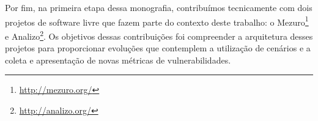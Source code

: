 Por fim, na primeira etapa dessa monografia, contribuímos tecnicamente com dois projetos de software livre que fazem parte do contexto deste trabalho: o Mezuro\footnote{\url{http://mezuro.org/}} e Analizo\footnote{\url{http://analizo.org/}}. Os objetivos dessas contribuições foi compreender a arquitetura desses projetos para proporcionar evoluções que contemplem a utilização de cenários e a coleta e apresentação de novas métricas de vulnerabilidades.